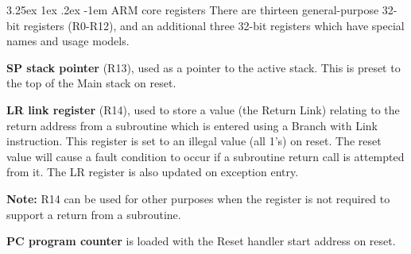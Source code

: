 \documentclass[11pt]{report}
\makeatletter
\renewcommand\subparagraph{\@startsection{subparagraph}{6}{\parindent}%
	{3.25ex \@plus1ex \@minus .2ex}%
	{-1em}%
	{\normalfont\normalsize\bfseries}}
\makeatother
\begin{document}
		\subparagraph{ARM core registers} There are thirteen general-purpose 32-bit registers (R0-R12), and an additional three 32-bit registers which have special names and usage models.
		\par \textbf{SP stack pointer} (R13), used as a pointer to the active stack. This is preset to the top of the Main stack on
		reset.
		\par \textbf{LR link register} (R14), used to store a value (the Return Link) relating to the return address from a subroutine which is entered using a Branch with Link instruction. This register is set to an illegal value (all 1’s) on reset. The reset value will cause a fault condition to occur if a subroutine return call is attempted from it. The LR register is also updated on exception
		entry.
		\par \textbf{Note:} R14 can be used for other purposes when the register is not required to support a return from
		a subroutine.
		\par \textbf{PC program counter} is loaded with the Reset handler start address on reset.
		
\end{document}
